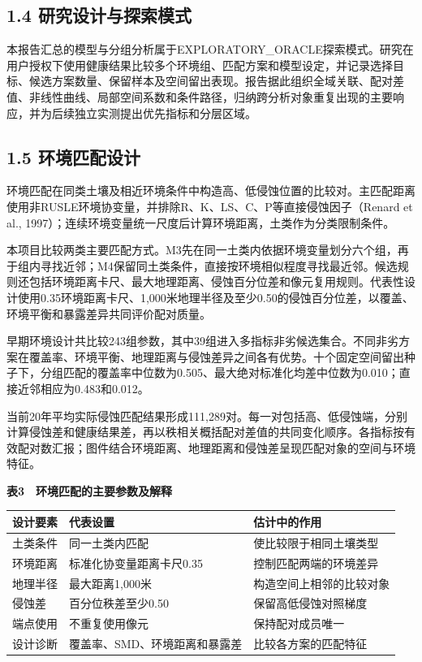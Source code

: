 \documentclass[
  11pt,
  a4paper,
]{ctexart}
\begin{document}
\hypertarget{ux7814ux7a76ux8bbeux8ba1ux4e0eux63a2ux7d22ux6a21ux5f0f}{%
\subsection{1.4
研究设计与探索模式}\label{ux7814ux7a76ux8bbeux8ba1ux4e0eux63a2ux7d22ux6a21ux5f0f}}

本报告汇总的模型与分组分析属于EXPLORATORY\_ORACLE探索模式。研究在用户授权下使用健康结果比较多个环境组、匹配方案和模型设定，并记录选择目标、候选方案数量、保留样本及空间留出表现。报告据此组织全域关联、配对差值、非线性曲线、局部空间系数和条件路径，归纳跨分析对象重复出现的主要响应，并为后续独立实测提出优先指标和分层区域。

\hypertarget{ux73afux5883ux5339ux914dux8bbeux8ba1}{%
\subsection{1.5
环境匹配设计}\label{ux73afux5883ux5339ux914dux8bbeux8ba1}}

环境匹配在同类土壤及相近环境条件中构造高、低侵蚀位置的比较对。主匹配距离使用非RUSLE环境协变量，并排除R、K、LS、C、P等直接侵蚀因子（Renard
et al.,
1997）；连续环境变量统一尺度后计算环境距离，土类作为分类限制条件。

本项目比较两类主要匹配方式。M3先在同一土类内依据环境变量划分六个组，再于组内寻找近邻；M4保留同土类条件，直接按环境相似程度寻找最近邻。候选规则还包括环境距离卡尺、最大地理距离、侵蚀百分位差和像元复用规则。代表性设计使用0.35环境距离卡尺、1,000米地理半径及至少0.50的侵蚀百分位差，以覆盖、环境平衡和暴露差异共同评价配对质量。

早期环境设计共比较243组参数，其中39组进入多指标非劣候选集合。不同非劣方案在覆盖率、环境平衡、地理距离与侵蚀差异之间各有优势。十个固定空间留出种子下，分组匹配的覆盖率中位数为0.505、最大绝对标准化均差中位数为0.010；直接近邻相应为0.483和0.012。

当前20年平均实际侵蚀匹配结果形成111,289对。每一对包括高、低侵蚀端，分别计算侵蚀差和健康结果差，再以秩相关概括配对差值的共同变化顺序。各指标按有效配对数汇报；图件结合环境距离、地理距离和侵蚀差呈现匹配对象的空间与环境特征。

\textbf{表3　环境匹配的主要参数及解释}

\begin{longtable}[]{@{}lll@{}}
\toprule
设计要素 & 代表设置 & 估计中的作用 \\
\midrule
\endhead
土类条件 & 同一土类内匹配 & 使比较限于相同土壤类型 \\
环境距离 & 标准化协变量距离卡尺0.35 & 控制匹配两端的环境差异 \\
地理半径 & 最大距离1,000米 & 构造空间上相邻的比较对象 \\
侵蚀差 & 百分位秩差至少0.50 & 保留高低侵蚀对照梯度 \\
端点使用 & 不重复使用像元 & 保持配对成员唯一 \\
设计诊断 & 覆盖率、SMD、环境距离和暴露差 & 比较各方案的匹配特征 \\
\bottomrule
\end{longtable}
\end{document}
